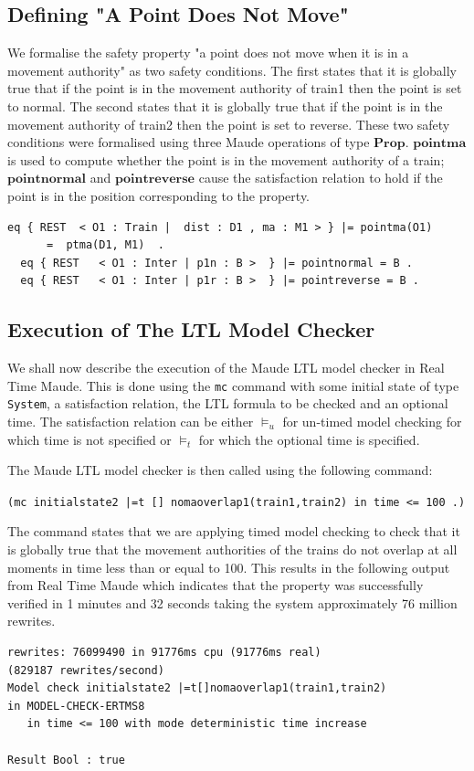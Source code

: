 \subsection*{Defining "A Point Does Not Move"}
We formalise the safety property "a point does not move when it is in a movement authority" as two safety conditions. The first states that it is globally true that if the point is in the movement authority of train1 then the point is set to normal. The second states that it is globally true that if the point is in the movement authority of train2 then the point is set to reverse. These two safety conditions were formalised using three Maude operations of type $\mathbf{Prop}$. $\mathbf{pointma}$ is used to compute whether the point is in the movement authority of a train; $\mathbf{pointnormal}$ and $\mathbf{pointreverse}$ cause the satisfaction relation to hold if the point is in the position corresponding to the property. 

\begin{lstlisting}[caption = The point properties]
  eq { REST  < O1 : Train |  dist : D1 , ma : M1 > } |= pointma(O1) 
      =  ptma(D1, M1)  .
  eq { REST   < O1 : Inter | p1n : B >  } |= pointnormal = B .
  eq { REST   < O1 : Inter | p1r : B >  } |= pointreverse = B .
\end{lstlisting}

\subsection{Execution of The LTL Model Checker}\label{sec:executionofltlchecker}

We shall now describe the execution of the Maude LTL model checker in Real Time Maude. This is done using the \texttt{mc} command with some initial state of type \texttt{System}, a satisfaction relation, the LTL formula to be checked and an optional time. The satisfaction relation can be either $\models_u$ for un-timed model checking for which time is not specified or $\models_t$ for which the optional time is specified.

The Maude LTL model checker is then called using the following command:

\begin{center}
\texttt{(mc initialstate2 |=t [] nomaoverlap1(train1,train2) in time <= 100 .)}
\end{center}
The command states that we are applying timed model checking to check that it is globally true that the movement authorities of the trains do not overlap at all moments in time less than or equal to 100. This results in the following output from Real Time Maude which indicates that the property was successfully verified in 1 minutes and 32 seconds taking the system approximately 76 million rewrites.
\begin{lstlisting}[caption = No overlapping movement authorities model checking result]
rewrites: 76099490 in 91776ms cpu (91776ms real) 
(829187 rewrites/second)
Model check initialstate2 |=t[]nomaoverlap1(train1,train2)
in MODEL-CHECK-ERTMS8
   in time <= 100 with mode deterministic time increase

Result Bool : true
\end{lstlisting}


